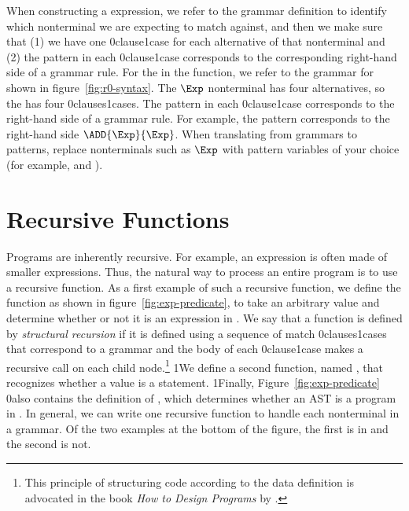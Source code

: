 \documentclass[7x10]{TimesAPriori_MIT}%
\def\racketEd{0}
\def\pythonEd{1}
\def\edition{1}
\newcommand{\racket}[1]{{\if\edition\racketEd{#1}\fi}}
\newcommand{\pythonColor}[0]{}
\newcommand{\python}[1]{{\if\edition\pythonEd\pythonColor #1\fi}}
\numberwithin{theorem}{chapter}
\numberwithin{definition}{chapter}
\numberwithin{equation}{chapter}
\begin{document}
When constructing a  expression, we refer to the grammar
definition to identify which nonterminal we are expecting to match
against, and then we make sure that (1) we have one
\racket{clause}\python{case} for each alternative of that nonterminal
and (2) the pattern in each \racket{clause}\python{case}
corresponds to the corresponding right-hand side of a grammar
rule. For the  in the  function, we refer to
the grammar for \LangInt{} shown in figure~\ref{fig:r0-syntax}. The $\Exp$
nonterminal has four alternatives, so the  has four
\racket{clauses}\python{cases}.  The pattern in each
\racket{clause}\python{case} corresponds to the right-hand side of a
grammar rule. For example, the pattern 
corresponds to the right-hand side $\ADD{\Exp}{\Exp}$. When
translating from grammars to patterns, replace nonterminals such as
$\Exp$ with pattern variables of your choice (for example,  and
).


\section{Recursive Functions}
\label{sec:recursion}

Programs are inherently recursive. For example, an expression is often
made of smaller expressions. Thus, the natural way to process an
entire program is to use a recursive function.  As a first example of
such a recursive function, we define the function  as
shown in figure~\ref{fig:exp-predicate}, to take an arbitrary
value and determine whether or not it is an expression in \LangInt{}.
%
We say that a function is defined by \emph{structural recursion} if
it is defined using a sequence of match \racket{clauses}\python{cases}
that correspond to a grammar and the body of each
\racket{clause}\python{case} makes a recursive call on each child
node.\footnote{This principle of structuring code according to the
  data definition is advocated in the book \emph{How to Design
    Programs} by \citet{Felleisen:2001aa}.}  \python{We define a
  second function, named , that recognizes whether a value
  is a \LangInt{} statement.}  \python{Finally, }
Figure~\ref{fig:exp-predicate} \racket{also} contains the definition of
, which determines whether an AST is a program in \LangInt{}.
In general, we can write one recursive function to handle each
nonterminal in a grammar. Of the
two examples at the bottom of the figure, the first is in
\LangInt{} and the second is not.
\end{document}
